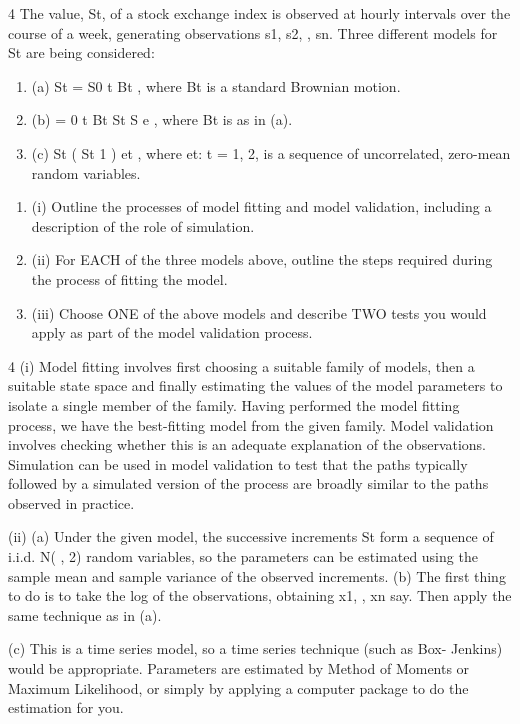 \documentclass[a4paper,12pt]{article}
\begin{document}
\begin{enumerate}

4 The value, St, of a stock exchange index is observed at hourly intervals over the
course of a week, generating observations s1, s2, , sn.
Three different models for St are being considered:
\begin{enumerate}
\item (a) St = S0 t Bt , where Bt is a standard Brownian motion.
\item (b) = 0 t Bt
St S e , where Bt is as in (a).
\item (c) St ( St 1 ) et , where {et: t = 1, 2, } is a sequence of
uncorrelated, zero-mean random variables.
\end{enumerate}

\begin{enumerate}
\item (i) Outline the processes of model fitting and model validation, including a
description of the role of simulation. 
\item (ii) For EACH of the three models above, outline the steps required during the
process of fitting the model. 
\item (iii) Choose ONE of the above models and describe TWO tests you would apply as
part of the model validation process. 
\end{enumerate}


4 (i) Model fitting involves first choosing a suitable family of models, then a
suitable state space and finally estimating the values of the model parameters
to isolate a single member of the family.
Having performed the model fitting process, we have the best-fitting model
from the given family. Model validation involves checking whether this is an
adequate explanation of the observations.
Simulation can be used in model validation to test that the paths typically
followed by a simulated version of the process are broadly similar to the paths
observed in practice.

(ii) (a) Under the given model, the successive increments St form a
sequence of i.i.d. N( , 2) random variables, so the parameters can be
estimated using the sample mean and sample variance of the observed
increments.
(b) The first thing to do is to take the log of the observations, obtaining x1,
, xn say. Then apply the same technique as in (a).

(c) This is a time series model, so a time series technique (such as Box-
Jenkins) would be appropriate.
Parameters are estimated by Method of Moments or Maximum
Likelihood, or simply by applying a computer package to do the
estimation for you.


\end{enumerate}
\end{document}
